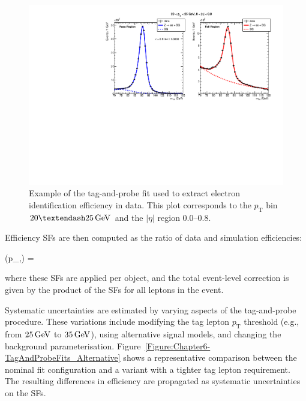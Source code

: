 \begin{figure}[!htbp]
\centering
\includegraphics[width=\textwidth]{Figures/Chapter6/data_id_pt_20_to_25_eta_0.0_to_0.8_tpzee_nominal.pdf}
\caption{Example of the tag-and-probe fit used to extract electron identification efficiency in data. This plot corresponds to the $p_{\mathrm{T}}$ bin $20–25\GeV$ and the $|\eta|$ region 0.0–0.8.}
\label{Figure:Chapter6-TagAndProbeFits_Nominal}
\end{figure}

Efficiency SFs are then computed as the ratio of data and simulation efficiencies:

\begin{equation_pad}
    (p_,\eta) = 
\end{equation_pad}

where these SFs are applied per object, and the total event-level correction is given by the product of the SFs for all leptons in the event.

Systematic uncertainties are estimated by varying aspects of the tag-and-probe procedure. These variations include modifying the tag lepton $p_{\text{T}}$ threshold (e.g., from $25\,\text{Ge\hspace{-.08em}V}$ to $35\,\text{Ge\hspace{-.08em}V}$), using alternative signal models, and changing the background parameterisation. Figure~\ref{Figure:Chapter6-TagAndProbeFits_Alternative} shows a representative comparison between the nominal fit configuration and a variant with a tighter tag lepton requirement. The resulting differences in efficiency are propagated as systematic uncertainties on the SFs.

